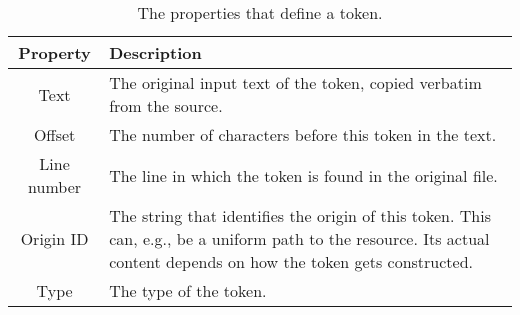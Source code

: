 \setlength{\extrarowheight}{.5em}
\begin{table}
	\caption{The properties that define a token.}
	\label{table:tokenProperties}
	\begin{tabularx}{\textwidth}{c|L}
		\textbf{Property} & \textbf{Description} \\
		\hline
		Text & The original input text of the token, copied verbatim from the source. \\
		Offset & The number of characters before this token in the text. \\
		Line number & The line in which the token is found in the original file. \\
		Origin ID & The string that identifies the origin of this token. This can, e.g., be a uniform path to the resource. Its actual content depends on how the token gets constructed. \\
		Type & The type of the token. \\
	\end{tabularx}
\end{table}
\setlength{\extrarowheight}{0em}